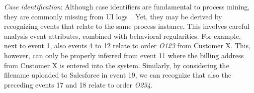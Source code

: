 \vspace{0.2em}
\newline
\textit{Case identification}: Although case identifiers are fundamental to process mining, they are commonly missing from UI logs~\cite{leno2021robotic}. Yet, they may be derived by recognizing events that relate to the same process instance. This involves careful analysis event attributes, combined with behavioral regularities.
For example, next to event 1, also events 4 to 12 relate to order \textit{O123} from Customer X. This, however, can only be properly inferred from event 11 where the billing address from Customer X is entered into the system. Similarly, by considering the filename uploaded to Salesforce in event 19, we can recognize that also the preceding events 17 and 18 relate to order \emph{O234}.



